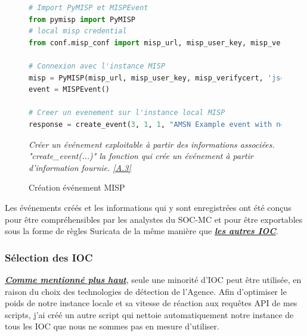\newpage

\begin{figure}[h]%
    \center%
\begin{lstlisting}[language=Python]
# Import PyMISP et MISPEvent
from pymisp import PyMISP
# local misp credential
from conf.misp_conf import misp_url, misp_user_key, misp_verifycert

# Connexion avec l'instance MISP
misp = PyMISP(misp_url, misp_user_key, misp_verifycert, 'json')
event = MISPEvent()

# Creer un evenement sur l'instance local MISP
response = create_event(3, 1, 1, "AMSN Example event with network IOC for Suricata", {"category": 'Network activity', "type": 'domain', "value": 'Vilain.com', "comment": 'AMSN Test domain for Suricata rule generation'}, ["tlp:white", "Phising"])
\end{lstlisting}
{\small
   \textit{Créer un événement exploitable à partir des informations associées. "create\_event(...)" la fonction qui crée un événement à partir d'information fournie. \hyperref[chap:annexe3]{[A.3]}}
    }
    \caption[Création événement MISP]{Création événement MISP}\label{fig:CreateMispEvent}
\end{figure}

\vspace{1em}

Les événements créés et les informations qui y sont enregistrées ont été conçus pour être compréhensibles par les analystes du SOC-MC et pour être exportables sous la forme de règles Suricata de la même manière que \hyperref[chap3:genRulesEvents]{\textbf{\textit{les autres IOC}}}.

\newpage

\subsubsection{Sélection des IOC}
\vspace{0.5em}

\hyperref[chap3:mispEvents]{\textit{\textbf{Comme mentionné plus haut}}}, seule une minorité d'IOC peut être utilisée, en raison du choix des technologies de détection de l'Agence. Afin d'optimiser le poids de notre instance locale et sa vitesse de réaction aux requêtes API de mes scripts, j'ai créé un autre script qui nettoie automatiquement notre instance de tous les IOC que nous ne sommes pas en mesure d'utiliser.\\

